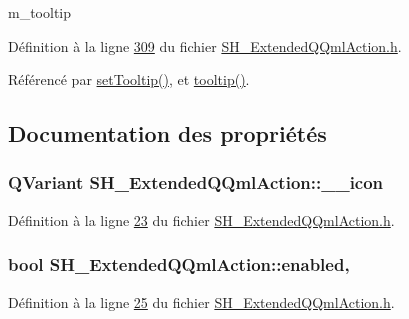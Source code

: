 m\-\_\-tooltip 



Définition à la ligne \hyperlink{SH__ExtendedQQmlAction_8h_source_l00309}{309} du fichier \hyperlink{SH__ExtendedQQmlAction_8h_source}{S\-H\-\_\-\-Extended\-Q\-Qml\-Action.\-h}.



Référencé par \hyperlink{classSH__ExtendedQQmlAction_a2368d82145d8f268af41ee5cb6d540d4}{set\-Tooltip()}, et \hyperlink{classSH__ExtendedQQmlAction_ac703f5c565bd0c7a0892627885042f0c}{tooltip()}.



\subsection{Documentation des propriétés}
\hypertarget{classSH__ExtendedQQmlAction_ad8ec5e4334cc550e7358eb3dcf1596f0}{
\subsubsection[{\-\_\-\-\_\-icon}]{\setlength{\rightskip}{0pt plus 5cm}Q\-Variant S\-H\-\_\-\-Extended\-Q\-Qml\-Action\-::\-\_\-\-\_\-icon\hspace{0.3cm}{\ttfamily [read]}}}\label{classSH__ExtendedQQmlAction_ad8ec5e4334cc550e7358eb3dcf1596f0}


Définition à la ligne \hyperlink{SH__ExtendedQQmlAction_8h_source_l00023}{23} du fichier \hyperlink{SH__ExtendedQQmlAction_8h_source}{S\-H\-\_\-\-Extended\-Q\-Qml\-Action.\-h}.

\hypertarget{classSH__ExtendedQQmlAction_ac2d51d5f8e6ee51883a8ea1efe974ad2}{
\subsubsection[{enabled}]{\setlength{\rightskip}{0pt plus 5cm}bool S\-H\-\_\-\-Extended\-Q\-Qml\-Action\-::enabled\hspace{0.3cm}{\ttfamily [read]}, {\ttfamily [write]}}}\label{classSH__ExtendedQQmlAction_ac2d51d5f8e6ee51883a8ea1efe974ad2}


Définition à la ligne \hyperlink{SH__ExtendedQQmlAction_8h_source_l00025}{25} du fichier \hyperlink{SH__ExtendedQQmlAction_8h_source}{S\-H\-\_\-\-Extended\-Q\-Qml\-Action.\-h}.

